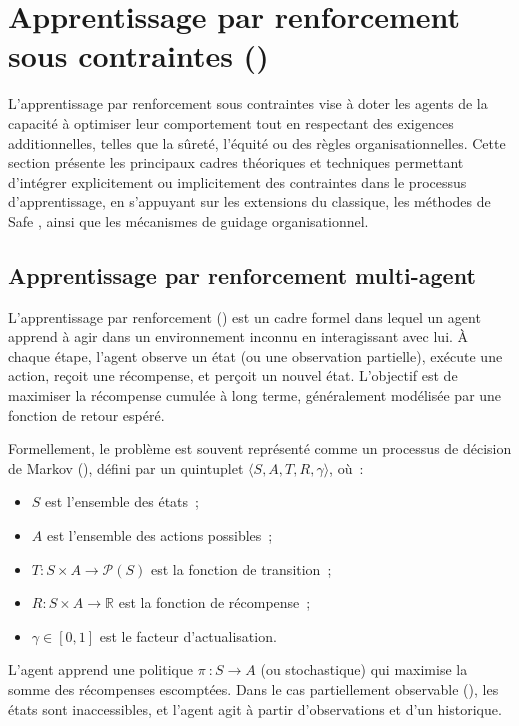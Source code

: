 \section{Apprentissage par renforcement sous contraintes ()}

L'apprentissage par renforcement sous contraintes vise à doter les agents de la capacité à optimiser leur comportement tout en respectant des exigences additionnelles, telles que la sûreté, l'équité ou des règles organisationnelles. Cette section présente les principaux cadres théoriques et techniques permettant d'intégrer explicitement ou implicitement des contraintes dans le processus d'apprentissage, en s'appuyant sur les extensions du  classique, les méthodes de Safe , ainsi que les mécanismes de guidage organisationnel.

\subsection{Apprentissage par renforcement multi-agent}

L'apprentissage par renforcement () est un cadre formel dans lequel un agent apprend à agir dans un environnement inconnu en interagissant avec lui. À chaque étape, l'agent observe un état (ou une observation partielle), exécute une action, reçoit une récompense, et perçoit un nouvel état. L'objectif est de maximiser la récompense cumulée à long terme, généralement modélisée par une fonction de retour espéré.

Formellement, le problème est souvent représenté comme un processus de décision de Markov (), défini par un quintuplet $\langle S, A, T, R, \gamma \rangle$, où~:
\begin{itemize}
  \item $S$ est l'ensemble des états~;
  \item $A$ est l'ensemble des actions possibles~;
  \item $T: S \times A \rightarrow \mathcal{P}(S)$ est la fonction de transition~;
  \item $R: S \times A \rightarrow \mathbb{R}$ est la fonction de récompense~;
  \item $\gamma \in [0,1]$ est le facteur d'actualisation.
\end{itemize}

L'agent apprend une politique $\pi~: S \rightarrow A$ (ou stochastique) qui maximise la somme des récompenses escomptées. Dans le cas partiellement observable (), les états sont inaccessibles, et l'agent agit à partir d'observations et d'un historique.


